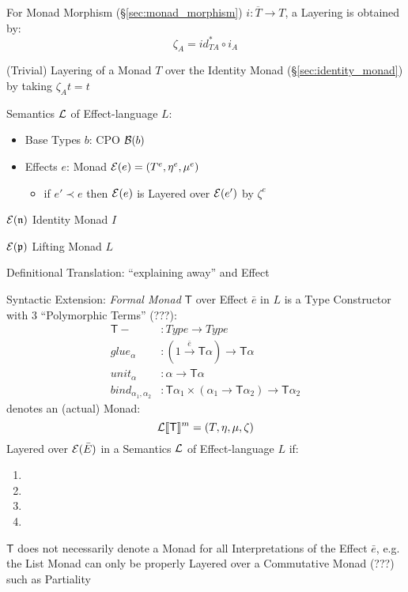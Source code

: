 For Monad Morphism (\S\ref{sec:monad_morphism}) $i : \overline{T}
\rightarrow T$, a Layering is obtained by:
\[
  \zeta_A = id^*_{T A} \circ i_A
\]

(Trivial) Layering of a Monad $T$ over the Identity Monad
(\S\ref{sec:identity_monad}) by taking $\zeta_A t = t$

Semantics $\mathcal{L}$ of Effect-language $L$:
\begin{itemize}
  \item Base Types $b$: CPO $\mathcal{B}(b)$
  \item Effects $e$: Monad $\mathcal{E}(e) = (T^e,\eta^e,\mu^e)$
    \begin{itemize}
      \item if $e' \prec e$ then $\mathcal{E}(e)$ is Layered over
        $\mathcal{E}(e')$ by $\zeta^e$
    \end{itemize}
\end{itemize}

$\mathcal{E}(\mathfrak{n})$ Identity Monad $I$

$\mathcal{E}(\mathfrak{p})$ Lifting Monad $L$

Definitional Translation: ``explaining away'' and Effect

Syntactic Extension: \emph{Formal Monad} $\mathsf{T}$ over Effect
$\bar{e}$ in $L$ is a Type Constructor with 3 ``Polymorphic Terms''
(???):
\begin{align*}
  \mathsf{T} - &: Type \rightarrow Type \\
  glue_\alpha &: (1 \xrightarrow{\bar{e}} \mathsf{T} \alpha)
    \rightarrow \mathsf{T} \alpha \\
  unit_\alpha &: \alpha \rightarrow \mathsf{T} \alpha \\
  bind_{\alpha_1,\alpha_2} &: \mathsf{T} \alpha_1 \times (\alpha_1
    \rightarrow \mathsf{T} \alpha_2) \rightarrow \mathsf{T} \alpha_2
\end{align*}
denotes an (actual) Monad:
\[
  \mathcal{L}\llbracket \mathsf{T} \rrbracket^m = (T,\eta,\mu,\zeta)
\]
Layered over $\mathcal{E}(\bar{E})$ in a Semantics $\mathcal{L}$ of
Effect-language $L$ if: %
\begin{enumerate}
  \item
  \item
  \item
  \item
\end{enumerate}

\fist $\mathsf{T}$ does not necessarily denote a Monad for all
Interpretations of the Effect $\bar{e}$, e.g. the List Monad can only
be properly Layered over a Commutative Monad (???) such as Partiality

